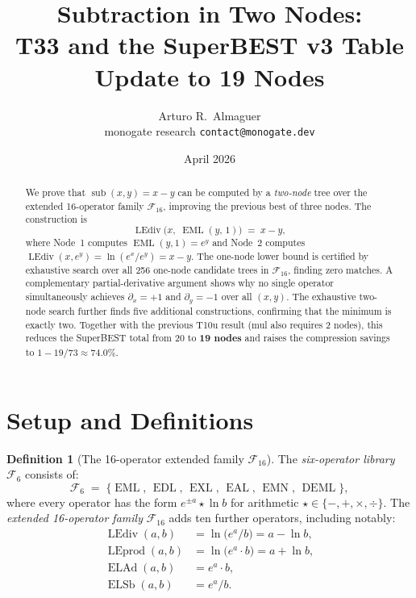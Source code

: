 \documentclass[12pt,a4paper]{article}
\title{Subtraction in Two Nodes:\\
       T33 and the SuperBEST v3 Table Update to 19 Nodes}
\author{Arturo R.\ Almaguer\\
\small monogate research \quad \texttt{contact@monogate.dev}}
\date{April 2026}
\theoremstyle{definition}
\newtheorem{definition}[theorem]{Definition}
\newcommand{\EML}{\operatorname{EML}}
\newcommand{\EDL}{\operatorname{EDL}}
\newcommand{\EXL}{\operatorname{EXL}}
\newcommand{\EAL}{\operatorname{EAL}}
\newcommand{\EMN}{\operatorname{EMN}}
\newcommand{\DEML}{\operatorname{DEML}}
\newcommand{\ELAd}{\operatorname{ELAd}}
\newcommand{\ELSb}{\operatorname{ELSb}}
\newcommand{\LEdiv}{\operatorname{LEdiv}}
\newcommand{\LEprod}{\operatorname{LEprod}}
\newcommand{\sub}{\operatorname{sub}}
\begin{document}
\maketitle

\begin{abstract}
We prove that $\sub(x,y) = x - y$ can be computed by a \emph{two-node} tree
over the extended 16-operator family $\mathcal{F}_{16}$, improving the
previous best of three nodes.  The construction is
\[
  \LEdiv\!\bigl(x,\;\EML(y,\,1)\bigr) \;=\; x - y,
\]
where Node~1 computes $\EML(y,1)=e^y$ and Node~2 computes
$\LEdiv(x,e^y)=\ln(e^x/e^y)=x-y$.
The one-node lower bound is certified by exhaustive search over all 256 one-node
candidate trees in $\mathcal{F}_{16}$, finding zero matches.
A complementary partial-derivative argument shows why no single operator
simultaneously achieves $\partial_x = +1$ and $\partial_y = -1$ over all
$(x,y)$.
The exhaustive two-node search further finds five additional constructions,
confirming that the minimum is exactly two.
Together with the previous T10u result (mul also requires 2 nodes), this
reduces the SuperBEST total from 20 to \textbf{19 nodes} and raises the
compression savings to $1 - 19/73 \approx \mathbf{74.0\%}$.
\end{abstract}

\tableofcontents
\bigskip

\section{Setup and Definitions}

\begin{definition}[The 16-operator extended family $\mathcal{F}_{16}$]
\label{def:F16}
The \emph{six-operator library} $\mathcal{F}_6$ consists of:
\[
  \mathcal{F}_6 \;=\; \{\EML,\,\EDL,\,\EXL,\,\EAL,\,\EMN,\,\DEML\},
\]
where every operator has the form $e^{\pm a} \star \ln b$ for arithmetic
$\star \in \{-,+,\times,\div\}$.
The \emph{extended 16-operator family} $\mathcal{F}_{16}$ adds ten further
operators, including notably:
\begin{align*}
  \LEdiv(a,b) &= \ln\!\bigl(e^{a}/b\bigr) = a - \ln b, \\
  \LEprod(a,b) &= \ln\!\bigl(e^{a} \cdot b\bigr) = a + \ln b, \\
  \ELAd(a,b)  &= e^{a} \cdot b, \\
  \ELSb(a,b)  &= e^{a} / b.
\end{align*}
\end{definition}
\end{document}
